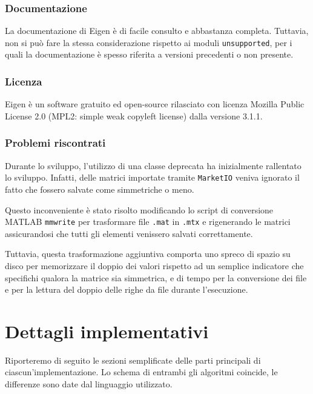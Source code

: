 \documentclass[11pt,italian]{article}
\begin{document}
\subsubsection*{Documentazione}
La documentazione di Eigen è di facile consulto e abbastanza completa. Tuttavia, non si può fare la stessa considerazione rispetto ai moduli \lstinline{unsupported}, per i quali la documentazione è spesso riferita a versioni precedenti o non presente.

\subsubsection*{Licenza}
Eigen è un software gratuito ed open-source rilasciato con licenza Mozilla Public License 2.0 (MPL2: simple weak copyleft license) dalla versione 3.1.1.

\subsubsection*{Problemi riscontrati}
Durante lo sviluppo, l'utilizzo di una classe deprecata ha inizialmente rallentato lo sviluppo. Infatti, delle matrici importate tramite \lstinline{MarketIO} veniva ignorato il fatto che fossero salvate come simmetriche o meno.

Questo inconveniente è stato risolto modificando lo script di conversione MATLAB \lstinline{mmwrite} per trasformare file \lstinline{.mat} in \lstinline{.mtx} e rigenerando le matrici assicurandosi che tutti gli elementi venissero salvati correttamente.

Tuttavia, questa trasformazione aggiuntiva comporta uno spreco di spazio su disco per memorizzare il doppio dei valori rispetto ad un semplice indicatore che specifichi qualora la matrice sia simmetrica, e di tempo per la conversione dei file e per la lettura del doppio delle righe da file durante l'esecuzione.

\newpage
\section{Dettagli implementativi}
Riporteremo di seguito le sezioni semplificate delle parti principali di ciascun'implementazione.
Lo schema di entrambi gli algoritmi coincide, le differenze sono date dal linguaggio utilizzato.
\end{document}

